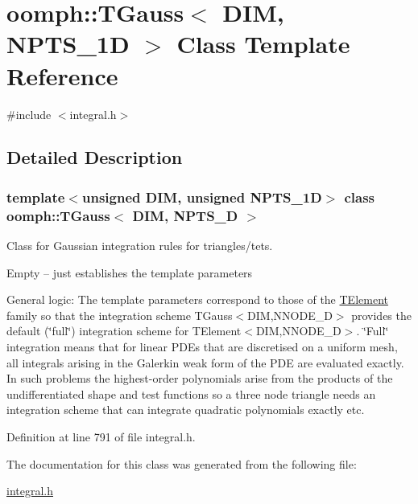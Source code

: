 \hypertarget{classoomph_1_1TGauss}{}\section{oomph\+:\+:T\+Gauss$<$ D\+IM, N\+P\+T\+S\+\_\+1D $>$ Class Template Reference}
\label{classoomph_1_1TGauss}


{\ttfamily \#include $<$integral.\+h$>$}



\subsection{Detailed Description}
\subsubsection*{template$<$unsigned D\+IM, unsigned N\+P\+T\+S\+\_\+1D$>$\newline
class oomph\+::\+T\+Gauss$<$ D\+I\+M, N\+P\+T\+S\+\_\+D $>$}

Class for Gaussian integration rules for triangles/tets.

Empty -- just establishes the template parameters

General logic\+: The template parameters correspond to those of the \hyperlink{classoomph_1_1TElement}{T\+Element} family so that the integration scheme T\+Gauss$<$\+D\+I\+M,\+N\+N\+O\+D\+E\+\_\+D$>$ provides the default (\char`\"{}full\char`\"{}) integration scheme for T\+Element$<$\+D\+I\+M,\+N\+N\+O\+D\+E\+\_\+D$>$. \char`\"{}\+Full\char`\"{} integration means that for linear P\+D\+Es that are discretised on a uniform mesh, all integrals arising in the Galerkin weak form of the P\+DE are evaluated exactly. In such problems the highest-\/order polynomials arise from the products of the undifferentiated shape and test functions so a three node triangle needs an integration scheme that can integrate quadratic polynomials exactly etc. 

Definition at line 791 of file integral.\+h.



The documentation for this class was generated from the following file\+:\begin{DoxyCompactItemize}
\item 
\hyperlink{integral_8h}{integral.\+h}\end{DoxyCompactItemize}
